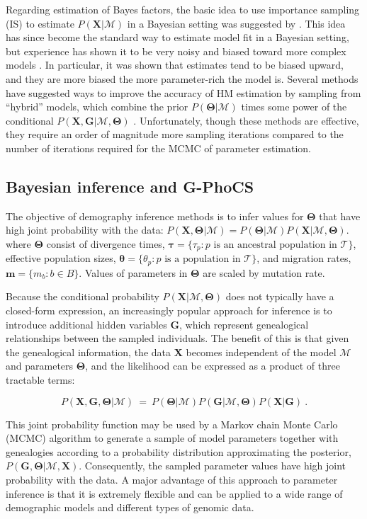 \documentclass[11pt]{article}
\newcommand{\vect}[1]{\boldsymbol{\mathbf{#1}}}
\newcommand{\X}{\vect{X}}
\newcommand{\M}{\mathcal{M}}
\newcommand{\Tr}{\mathcal{T}}
\newcommand{\G}{\vect{G}}
\newcommand{\T}{\vect{\Theta}}
\newcommand{\1}{\mathbbm{1}}
\newcommand{\gp}{G-PhoCS }
\newcommand{\taus}{\vect\tau}
\newcommand{\thetas}{\vect\theta}
\newcommand{\migs}{\vect{m}}
\begin{document}
Regarding estimation of Bayes factors, the basic idea to use importance sampling (IS) to estimate $P(\X|\M)$ in a Bayesian setting was suggested by \cite{NEWTRAFT94}. 
%
This idea has since become the standard way to estimate model fit in a Bayesian setting, but experience has shown it to be very noisy and biased toward more complex models \citep{XIEETAL11}.
%
In particular, it was shown that estimates tend to be biased upward, and they are more biased the more parameter-rich the model is. 
%
Several methods have suggested ways to improve the accuracy of HM estimation by sampling from ``hybrid'' models, which combine the prior $P(\T|\M)$ times some power of the conditional $P(\X,\G|\M,\T)$ \citep{LARTPHIL06,XIEETAL11}.
%
Unfortunately, though these methods are effective, they require an order of magnitude more sampling iterations compared to the number of iterations required for the MCMC of parameter estimation.



\subsection{Bayesian inference and \gp} \label{Bayesian inference and \gp}

The objective of demography inference methods is to infer values for $\T$ that have high joint probability with the data:
$P(\X,\T|\M)=P(\T|\M)P(\X|\M,\T)$.
%
where $\T$ consist of divergence times, $\taus=\{\tau_p:p \text{ is an ancestral population in } \Tr\}$,
effective population sizes, $\thetas=\{\theta_p: p \text{ is a population in } \Tr\}$, and migration rates, $\migs=\{m_b:b \in B\}$.
%
Values of parameters in $\T$ are scaled by mutation rate.

Because the conditional probability $P(\X|\M,\T)$ does not typically have a closed-form expression, an increasingly popular approach for inference is to introduce additional hidden variables $\G$, which represent genealogical relationships
between the sampled individuals.
%
The benefit of this is that given the genealogical information, the data $\X$ becomes independent of the model $\M$ and parameters $\T$,
and the likelihood can be expressed as a product of three tractable terms:

%
\begin{equation}\label{eq:likelihood}
 P(\X,\G,\T|\M) ~=~ P(\T|\M) P(\G|\M,\T) P(\X|\G)~.
\end{equation}
%
%

This joint probability function may be used by a Markov chain Monte Carlo (MCMC) algorithm to generate a sample of model parameters
together with genealogies according to a probability distribution approximating the posterior, $P(\G,\T|\M,\X)$.
%
Consequently, the sampled parameter values have high joint probability with the data.
%
A major advantage of this approach to parameter inference is that it is extremely flexible and can be applied to a wide range of demographic models and different types of genomic data.
\end{document}
